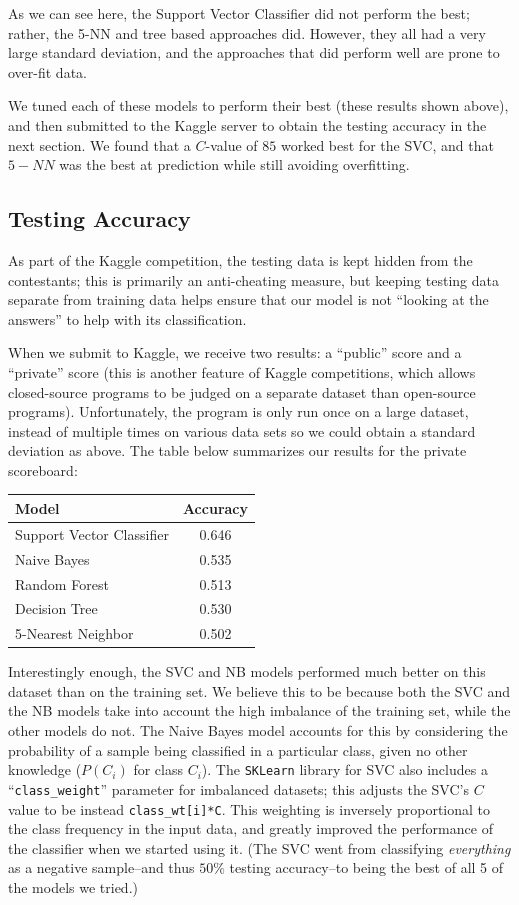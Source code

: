 \documentclass{article} %
\begin{document}
As we can see here, the Support Vector Classifier did not perform the best; rather, the 5-NN and tree based approaches did.  However, they all had a very large standard deviation, and the approaches that did perform well are prone to over-fit data.  

We tuned each of these models to perform their best (these results shown above), and then submitted to the Kaggle server to obtain the testing accuracy in the next section.  We found that a $C$-value of $85$ worked best for the SVC, and that $5-NN$ was the best at prediction while still avoiding overfitting.

\subsection{Testing Accuracy}
As part of the Kaggle competition, the testing data is kept hidden from the contestants; this is primarily an anti-cheating measure, but keeping testing data separate from training data helps ensure that our model is not ``looking at the answers'' to help with its classification.  

When we submit to Kaggle, we receive two results: a ``public'' score and a ``private'' score (this is another feature of Kaggle competitions, which allows closed-source programs to be judged on a separate dataset than open-source programs).  Unfortunately, the program is only run once on a large dataset, instead of multiple times on various data sets so we could obtain a standard deviation as above.  The table below summarizes our results for the private scoreboard:

\begin{center}\begin{tabular}{|l|c|}\hline
\textbf{Model} & \textbf{Accuracy} \\\hline
Support Vector Classifier & 0.646 \\
Naive Bayes & 0.535 \\
Random Forest & 0.513 \\
Decision Tree & 0.530 \\
5-Nearest Neighbor & 0.502 \\\hline
\end{tabular}\end{center}

Interestingly enough, the SVC and NB models performed much better on this dataset than on the training set.  We believe this to be because both the SVC and the NB models take into account the high imbalance of the training set, while the other models do not.  The Naive Bayes model accounts for this by considering the probability of a sample being classified in a particular class, given no other knowledge ($P(C_i)$ for class $C_i$).  The \texttt{SKLearn} library for SVC also includes a ``\texttt{class\_weight}'' parameter for imbalanced datasets; this adjusts the SVC's $C$ value to be instead \texttt{class\_wt[i]*C}.  This weighting is inversely proportional to the class frequency in the input data, and greatly improved the performance of the classifier when we started using it. (The SVC went from classifying \textit{everything} as a negative sample--and thus $50\%$ testing accuracy--to being the best of all 5 of the models we tried.)
\end{document}
